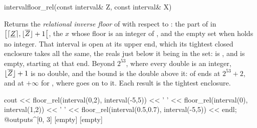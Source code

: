 \documentclass[12pt,a4paper,twoside,openright]{book}
\begin{document}
\begin{deffun}{interval}{floor\_rel}{(const interval\& Z, const interval\& X)}
  \begin{operation}
  \end{operation}
  Returns the \emph{relational inverse floor} of  with respect to
  : the part of  in
  $\left[\lceil\underline{Z}\rceil,\lfloor\overline{Z}\rfloor+1\right[$,
  the $x$ whose floor is an integer of , and the empty set when
   holds no integer. That interval is open at its upper end, which
  its tightest closed enclosure takes all the same, the reals just below it
  being in the set:  is
  , and  is empty,
   starting at that end. Beyond $2^{53}$, where every double is an
  integer, $\lfloor\overline{Z}\rfloor+1$ is no double, and the bound is
  the double above it:  of  ends at
  $2^{53}+2$, and at $+\infty$ for ,
  where  goes on to it. Each result is the tightest
  enclosure.\newinvfive
\begin{example}
cout << floor_rel(interval(0,2), interval(-5,5)) << ' '
     << floor_rel(interval(0), interval(1,2)) << ' '
     << floor_rel(interval(0.5,0.7), interval(-5,5)) << endl;
@outputs^[0, 3] [empty] [empty]~
\end{example}
\end{deffun}
\end{document}
